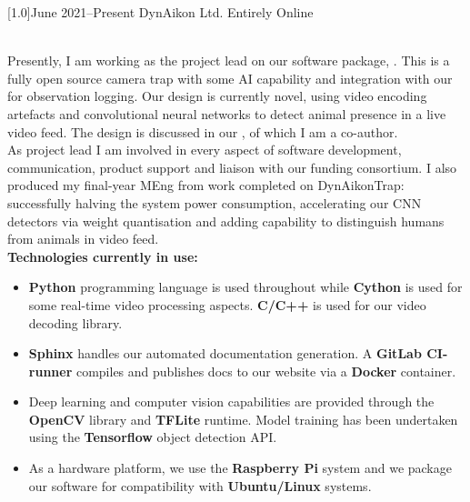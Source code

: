 \documentclass[]{cv-style}     %
\begin{document}
\begin{entrylist}
\entry
  {\scalebox{.8}[1.0]{June 2021--Present}}
  {DynAikon Ltd.}
  {Entirely Online}
  {\\
  Presently, I am working as the project lead on our software package, . This is a fully open source camera trap with some AI capability and integration with our  for observation logging. Our design is currently novel, using video encoding artefacts and convolutional neural networks to detect animal presence in a live video feed. The design is discussed in our , of which I am a co-author. 
  \\
  As project lead I am involved in every aspect of software development, communication, product support and liaison with our funding consortium. I also produced my final-year MEng  from work completed on DynAikonTrap: successfully halving the system power consumption, accelerating our CNN detectors via weight quantisation and adding capability to distinguish humans from animals in video feed. 
  \\
  \textbf{Technologies currently in use: }
  \begin{itemize}
    \item \textbf{Python} programming language is used throughout while \textbf{Cython} is used for some real-time video processing aspects. \textbf{C/C++} is used for our video decoding library. 
    \item \textbf{Sphinx} handles our automated documentation generation. A \textbf{GitLab CI-runner} compiles and publishes docs to our website via a \textbf{Docker} container. 
    \item Deep learning and computer vision capabilities are provided through the \textbf{OpenCV} library and \textbf{TFLite} runtime. Model training has been undertaken using the \textbf{Tensorflow} object detection API.
    \item As a hardware platform, we use the \textbf{Raspberry Pi} system and we package our software for compatibility with \textbf{Ubuntu/Linux} systems.
    

\end{itemize}}
\end{entrylist}
\end{document}
